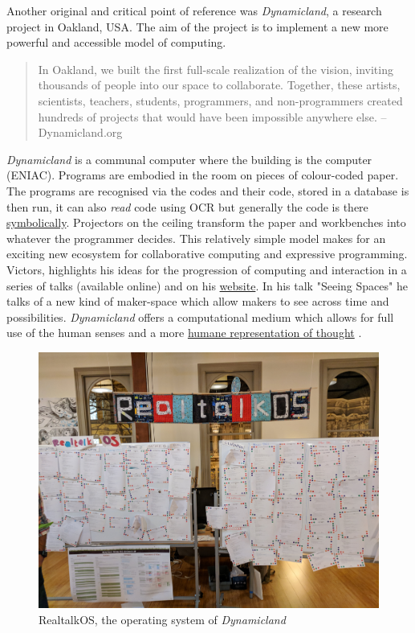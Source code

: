 \documentclass[12pt]{report}
\begin{document}
Another original and critical point of reference was \emph{Dynamicland}, a research
project in Oakland, USA. The aim of the project is to implement a new more
powerful and accessible model of computing.

\begin{quote}


In Oakland, we built the first full-scale realization of the vision, inviting
thousands of people into our space to collaborate. Together, these artists,
scientists, teachers, students, programmers, and non-programmers created
hundreds of projects that would have been impossible anywhere else.
-- Dynamicland.org 
\end{quote}


\emph{Dynamicland} is a communal computer where the building is the computer (ENIAC).
Programs are embodied in the room on pieces of colour-coded paper. The programs
are recognised via the codes and their code, stored in a database is then run,
it can also \emph{read} code using OCR but generally the code is there \href{https://thenewstack.io/dynamicland-rethinks-computer-interfaces/}{symbolically}.
Projectors on the ceiling transform the paper and workbenches into whatever the
programmer decides. This relatively simple model makes for an exciting new
ecosystem for collaborative computing and expressive programming. Victors,
highlights his ideas for the progression of computing and interaction in a
series of talks (available online) and on his \href{http://worrydream.com}{website}. In his talk "Seeing
Spaces" he talks of a new kind of maker-space which allow makers to see across
time and possibilities. \emph{Dynamicland} offers a computational medium which allows
for full use of the human senses and a more \href{https://vimeo.com/115154289}{humane representation of thought}
\cite{VictorKayDynamicLand}. \\

\begin{figure}[htbp]
\centering
\includegraphics[width=12cm]{assets/realtalk-os.jpg}
\caption{RealtalkOS, the operating system of \emph{Dynamicland}}
\end{figure}  
\end{document}
